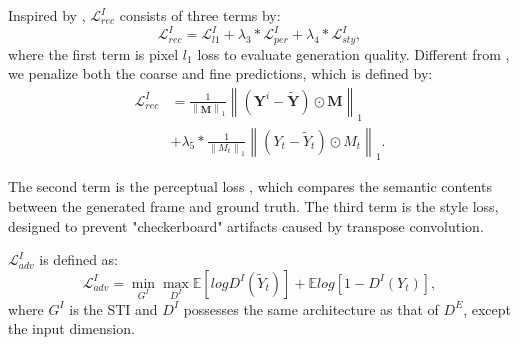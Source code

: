 Inspired by \cite{nazeri2019edgeconnect}, $\mathcal{L}^{I}_{rec}$ consists of three terms by:
\begin{equation}
\mathcal{L}^{I}_{rec}=\mathcal{L}^{I}_{l1}+\lambda_3 *\mathcal{L}^{I}_{per}+\lambda_4 *\mathcal{L}^{I}_{sty},
\end{equation}
where the first term is pixel $l_1$ loss to evaluate generation quality. Different from \cite{nazeri2019edgeconnect}, we penalize both the coarse and fine predictions, which is defined by:
\begin{equation}
\begin{aligned}
\mathcal{L}^{I}_{rec}&=\frac{1}{\left\|\boldsymbol{M} \right\|_1}\left\|(\boldsymbol{Y}^i-\widetilde{\boldsymbol{Y}})\odot \boldsymbol{M}\right\|_1\\ &+\lambda_5*\frac{1}{\left\|M_t \right\|_1}\left\|(Y_t-\widetilde{Y}_t)\odot M_t\right\|_1.
\end{aligned}
\end{equation}
%

The second term is the perceptual loss \cite{gatys2015neural}, which compares the semantic contents between the generated frame and ground truth. The third term is the style loss, designed to prevent "checkerboard" artifacts \cite{Sajjadi_2017_ICCV} caused by transpose convolution.






$\mathcal{L}^I_{adv}$ is defined as:
\begin{equation}
\label{eq:inp_adver}
\mathcal{L}^I_{adv}=\min\limits_{G^I} \max \limits_{D^I}\mathbb{E}[logD^I(\widetilde{Y}_t)]+\mathbb{E}log[1-D^I(Y_{t})],
\end{equation}
where $G^I$ is the STI and $D^I$ possesses the same architecture as that of $D^E$, except the input dimension.